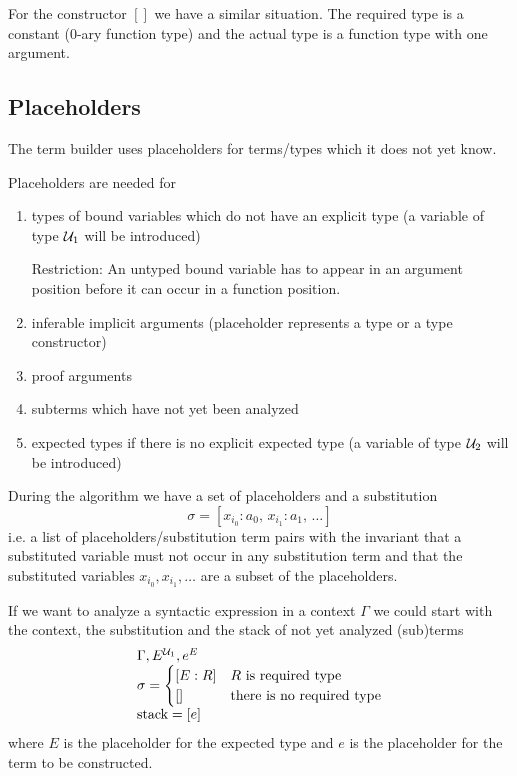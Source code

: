 For the constructor $[]$ we have a similar situation. The required type is a
constant (0-ary function type) and the actual type is a function type with one
argument.




\subsection{Placeholders}

The term builder uses placeholders for terms/types which it does not yet know.

Placeholders are needed for
%
\begin{enumerate}

\item types of bound variables which do not have an explicit type (a variable
  of type ${\cal{U}}_1$ will be introduced)

  Restriction: An untyped bound variable has to appear in an argument position
  before it can occur in a function position.

\item inferable implicit arguments (placeholder represents a type or a type
  constructor)

\item proof arguments

\item subterms which have not yet been analyzed

\item expected types if there is no explicit expected type (a variable of type
  ${\cal{U}}_2$ will be introduced)

\end{enumerate}



During the algorithm we have a set of placeholders and a substitution
$$
\sigma = [x_{i_0}: a_0,\, x_{i_1}: a_1,\, \ldots]
$$
i.e. a list of placeholders/substitution term pairs with the invariant that a
substituted variable must not occur in any substitution term and that the
substituted variables $x_{i_0}, x_{i_1}, \ldots$ are a subset of the
placeholders.



If we want to analyze a syntactic expression in a context $\Gamma$ we could
start with the context, the substitution and the stack of not yet analyzed
(sub)terms
$$
%
\begin{array}{l}
  \Gamma, E^{\Any_1}, e^E
  \\
  \sigma =
  \begin{cases}
    [E : R] & R \text{ is required type}
    \\
    []      & \text{there is no required type}
  \end{cases}
  \\
  \text{stack} = [e]
\end{array}
$$
where $E$ is the placeholder for the expected type and $e$ is the placeholder
for the term to be constructed.



